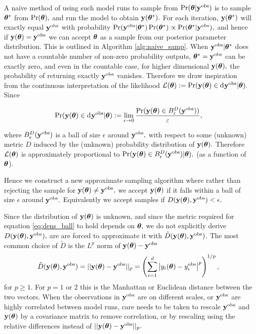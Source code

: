 A naive method of using such model runs to sample from
$\Pr(\bm{\theta}|\mathbf{y}^{\mathrm{obs}})$ is to sample
$\bm{\theta}^\ast$ from $\Pr(\bm{\theta}),$ and run the model to obtain
$\mathbf{y}(\bm{\theta}^\ast).$ For each iteration,
$\mathbf{y}(\bm{\theta}^\ast)$ will exactly equal $\mathbf{y}^{\mathrm{obs}}$
with probability $\Pr(\mathbf{y}^{\mathrm{obs}}|\bm{\theta}^\ast)\Pr(\bm{\theta}^\ast)
    \propto \Pr(\bm{\theta}^\ast|\mathbf{y}^{\mathrm{obs}}),$
and hence if $\mathbf{y}(\bm{\theta}) = \mathbf{y}^{\mathrm{obs}}$ we can accept $\bm{\theta}$ as a sample
from our posterior parameter distribution. This is outlined in
Algorithm \ref{alg:naive_samp}. When
$\mathbf{y}^{\mathrm{obs}}|\bm{\theta}^\ast$ does not have a countable number of non-zero
probability outputs,
$\bm{\theta}^\ast = \mathbf{y}^{\mathrm{obs}}$ can be exactly zero, and even in the
countable case, for
higher dimensional $\mathbf{y}(\bm{\theta}),$ the probability of returning exactly
$\mathbf{y}^{\mathrm{obs}}$ vanishes. Therefore we draw inspiration from the continuous
interpretation of the likelihood
$\mathcal{L}(\btheta) := \Pr(\by(\btheta) \in \diff \by^\obs|\btheta).$
Since

\begin{equation}\label{eq:dens_ball}
    \Pr(\by(\btheta) \in \diff \by^\obs|\btheta)
    := \lim_{\epsilon \to 0}
    \frac{\Pr(\by(\btheta) \in B^D_\epsilon(\by^\obs))}{\varepsilon},
\end{equation}

where $B^D_\epsilon(\mathbf{y}^{\mathrm{obs}})$ is a ball of size $\epsilon$ around $\mathbf{y}^{\mathrm{obs}},$
with respect to some (unknown) metric $D$ induced by the (unknown)
probability distribution of $\mathbf{y}(\bm{\theta}).$ Therefore $\mathcal{L}(\bm{\theta})$ is
approximately proportional
to $\Pr(\mathbf{y}(\bm{\theta}) \in B^D_\epsilon(\mathbf{y}^{\mathrm{obs}}) | \bm{\theta}),$
(as a function of $\bm{\theta}$).

Hence we construct a new approximate sampling algorithm where rather than
rejecting the sample for $\mathbf{y}(\bm{\theta}) \neq \mathbf{y}^{\mathrm{obs}},$ we accept
$\mathbf{y}(\bm{\theta})$ if it falls within a ball of size $\epsilon$ around $\mathbf{y}^{\mathrm{obs}}.$
Equivalently we accept samples if $D(\mathbf{y}(\bm{\theta}), \mathbf{y}^{\mathrm{obs}}) < \epsilon.$

Since the distribution of $\mathbf{y}(\bm{\theta})$ is unknown, and since the metric
required for equation \ref{eq:dens_ball} to hold depends on $\bm{\theta},$ we do
not explicitly derive $D(\mathbf{y}(\bm{\theta}), \mathbf{y}^{\mathrm{obs}}),$ are are forced to
approximate it with $\tilde{D}(\mathbf{y}(\bm{\theta}), \mathbf{y}^{\mathrm{obs}})$. The most common choice
of $\tilde{D}$ is the $L^p$ norm of $\mathbf{y}(\bm{\theta}) - \mathbf{y}^{\mathrm{obs}}$
$$
    \tilde{D}(\mathbf{y}(\bm{\theta}), \mathbf{y}^{\mathrm{obs}})
    =||\mathbf{y}(\bm{\theta}) - \mathbf{y}^{\mathrm{obs}}||_p
    = \left(\sum_{i = 1}^d
    \left|y_i(\bm{\theta})
    - y_i^{\mathrm{obs}}\right|^p\right)^{1/p},
$$
for $p\geq 1.$ For $p=1$ or $2$ this is the Manhattan or Euclidean distance 
between the two vectors. When the observations in $\mathbf{y}^{\mathrm{obs}}$ are on different
scales, or $\mathbf{y}^{\mathrm{obs}}$ are highly correlated between model runs, care needs to 
be taken to rescale $\mathbf{y}^{\mathrm{obs}}$ and $\mathbf{y}(\bm{\theta})$ by a covariance matrix to 
remove correlation, or by rescaling using the relative differences instead of
$||\mathbf{y}(\bm{\theta}) - \mathbf{y}^{\mathrm{obs}}||_p.$

